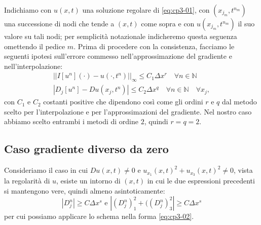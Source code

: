 Indichiamo con $u(x,t)$ una soluzione regolare di \eqref{eq:cp3-01}, con $(x_{j_m},t^{n_m})$ una successione di nodi che tende a $(x,t)$ come sopra e con $u(x_{j_m},t^{n_m})$ il suo valore su tali nodi; per semplicità notazionale indicheremo questa seguenza omettendo il pedice $m$.
Prima di procedere con la consistenza, facciamo le seguenti ipotesi sull'errore commesso nell'approssimazione del gradiente e nell'interpolazione:
\begin{gather}
\label{eq:cp3-04}
||I[u^n](\cdot)-u(\cdot,t^n)||_{\infty}\le C_1\Delta x^r\quad\forall n\in\mathbb{N} \\
\label{eq:cp3-05}
|D_j[u^n]-Du(x_j,t^n)|\le C_2\Delta x^q\quad\forall n\in\mathbb{N}\quad\forall x_j, 
\end{gather}
con $C_1$ e $C_2$ costanti positive che dipendono così come gli ordini $r$ e $q$ dal metodo scelto per l'interpolazione e per l'approssimazioni del gradiente. Nel nostro caso abbiamo scelto entrambi i metodi di ordine $2$, quindi $r=q=2$.

%
\subsection{Caso gradiente diverso da zero}

Consideriamo il caso in cui $Du(x,t)\ne 0$ e $u_{x_1}(x,t)^2+u_{x_3}(x,t)^2\ne 0$, vista la regolarità di $u$, esiste un intorno di $(x,t)$ in cui le due espressioni precedenti si mantengono vere, quindi almeno asintoticamente:
\begin{equation}
  \label{eq:cp3-sc21-01}
|D_j^n|\ge C\Delta x^s\text{ e }|(D_j^n)_1^2+((D_j^n)_3^2|\ge C\Delta x^s
\end{equation}
per cui possiamo applicare lo schema nella forma \eqref{eq:cp3-02}.

